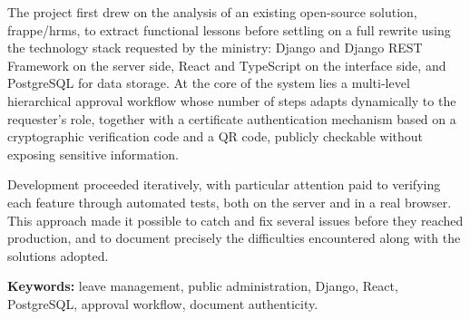 The project first drew on the analysis of an existing open-source solution, frappe/hrms, to extract functional lessons before settling on a full rewrite using the technology stack requested by the ministry: Django and Django REST Framework on the server side, React and TypeScript on the interface side, and PostgreSQL for data storage. At the core of the system lies a multi-level hierarchical approval workflow whose number of steps adapts dynamically to the requester's role, together with a certificate authentication mechanism based on a cryptographic verification code and a QR code, publicly checkable without exposing sensitive information.

Development proceeded iteratively, with particular attention paid to verifying each feature through automated tests, both on the server and in a real browser. This approach made it possible to catch and fix several issues before they reached production, and to document precisely the difficulties encountered along with the solutions adopted.

\vspace{0.5cm}
\noindent\textbf{Keywords:} leave management, public administration, Django, React, PostgreSQL, approval workflow, document authenticity.
